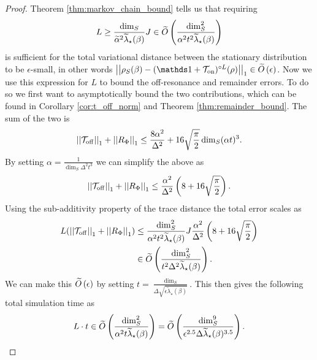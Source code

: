 \begin{proof}
    Theorem \ref{thm:markov_chain_bound} tells us that requiring
    \begin{align}
        L \ge \frac{\dim_S}{\widetilde{\alpha}^2 \widetilde{\lambda}_\star(\beta)} J \in \widetilde{O} \left( \frac{\dim_S^2}{\alpha^2 t^2 \widetilde{\lambda}_\star(\beta)} \right)
    \end{align}
    is sufficient for the total variational distance between the stationary distribution to be $\epsilon$-small, in other words $\norm{\rho_S(\beta) - (\identity + \TT_{\on})^{\circ L}(\rho)}_1 \in \bigotilde{\epsilon}$. Now we use this expression for $L$ to bound the off-resonance and remainder errors. To do so we first want to asymptotically bound the two contributions, which can be found in Corollary \ref{cor:t_off_norm} and Theorem \ref{thm:remainder_bound}. The sum of the two is
    \begin{equation}
        \left| \left| \mathcal{T}_{\rm off} \right| \right|_1 + \left| \left| R_{\Phi} \right| \right|_1 \le \frac{8 \alpha^2}{\Delta^2} + 16 \sqrt{\frac{\pi}{2}} \dim_S (\alpha t)^3.
    \end{equation}
    By setting $\alpha = \frac{1}{\dim_S \Delta^2 t^3}$ we can simplify the above as
    \begin{equation}
        \left| \left| \mathcal{T}_{\rm off} \right| \right|_1 + \left| \left| R_{\Phi} \right| \right|_1 \le \frac{\alpha^2}{\Delta^2} \left(8 + 16 \sqrt{\frac{\pi}{2}} \right).
    \end{equation}
    Using the sub-additivity property of the trace distance the total error scales as
    \begin{align}
        L (\left| \left| \mathcal{T}_{\rm off} \right| \right|_1 + \left| \left| R_{\Phi} \right| \right|_1) &\le \frac{\dim_S^2}{\alpha^2 t^2 \widetilde{\lambda}_\star(\beta)} J \frac{\alpha^2}{\Delta^2} \left(8 + 16 \sqrt{\frac{\pi}{2}} \right) \\
        &\in \widetilde{O} \left( \frac{\dim_S^2}{t^2 \Delta^2 \widetilde{\lambda}_\star(\beta)} \right).
    \end{align}
    We can make this $\widetilde{O} \left( \epsilon \right)$ by setting $t = \frac{\dim_S}{\Delta \sqrt{\epsilon \widetilde{\lambda}_\star(\beta)}}$.
    This then gives the following total simulation time as
    \begin{align}
        L\cdot t \in \widetilde{O} \left( \frac{\dim_S^2}{\alpha^2 t \widetilde{\lambda}_\star(\beta)}  \right) = \widetilde{O} \left( \frac{\dim_S^9}{\epsilon^{2.5} \Delta  \widetilde{\lambda}_\star(\beta)^{3.5}} \right).
    \end{align}
    

\end{proof}
